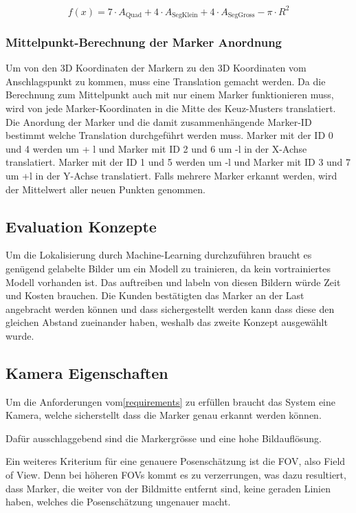 \[
f(x) = 7 \cdot A_\text{Quad} + 4 \cdot A_\text{SegKlein} + 4 \cdot A_\text{SegGross} - \pi \cdot R^2
\]


\subsubsection{Mittelpunkt-Berechnung der Marker Anordnung}
\label{sec:middlePoint}

Um von den 3D Koordinaten der Markern zu den 3D Koordinaten vom Anschlagspunkt zu kommen, muss eine Translation gemacht werden. Da die Berechnung zum Mittelpunkt auch mit nur einem Marker funktionieren muss, wird von jede Marker-Koordinaten in die Mitte des Keuz-Musters translatiert. Die Anordung der Marker und die damit zusammenhängende Marker-ID bestimmt welche Translation durchgeführt werden muss. Marker mit der ID 0 und 4 werden um + l und Marker mit ID 2 und 6 um -l in der X-Achse translatiert. Marker mit der ID 1 und 5 werden um -l und Marker mit ID 3 und 7 um +l in der Y-Achse translatiert. Falls mehrere Marker erkannt werden, wird der Mittelwert aller neuen Punkten genommen.

\subsection{Evaluation Konzepte}
Um die Lokalisierung durch Machine-Learning durchzuführen braucht es genügend gelabelte Bilder um ein Modell zu trainieren, da kein vortrainiertes Modell vorhanden ist. Das auftreiben und labeln von diesen Bildern würde Zeit und Kosten brauchen. Die Kunden bestätigten das Marker an der Last angebracht werden können und dass sichergestellt werden kann dass diese den gleichen Abstand zueinander haben, weshalb das zweite Konzept ausgewählt wurde.

\subsection{Kamera Eigenschaften}

Um die Anforderungen vom\ref{requirements} zu erfüllen braucht das System eine Kamera, welche sicherstellt dass die Marker genau erkannt werden können.

Dafür ausschlaggebend sind die Markergrösse und eine hohe Bildauflösung\cite{noauthor_designing_2020}. 

Ein weiteres Kriterium für eine genauere Posenschätzung ist die FOV, also Field of View. 
Denn bei höheren FOVs kommt es zu verzerrungen, was dazu resultiert, dass Marker, die weiter von der Bildmitte entfernt sind, keine geraden Linien haben, welches die Posenschätzung ungenauer macht.


